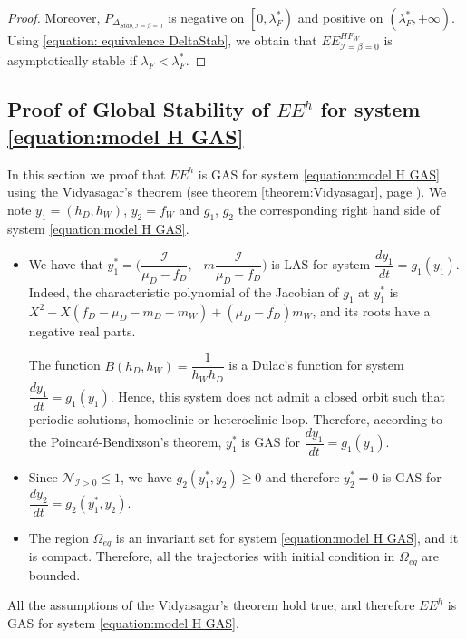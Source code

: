 \documentclass{article}
\newcommand{\lfw}{\lambda_{F}}
\newcommand{\lfw}{\lambda_{F}}
\newcommand{\cI}{\mathcal{I}}
\newcommand{\N}{\mathcal{N}}
\theoremstyle{definition}
\theoremstyle{remark}
\begin{document}
\begin{appendix}
\begin{proof}
Moreover, $P_{\Delta_{Stab, \cI = \beta = 0}}$ is negative on $\left[0, \lfw^* \right)$ and positive on $\left(\lfw ^*, +\infty \right)$. Using \eqref{equation: equivalence DeltaStab}, we obtain that $EE^{HF_W}_{\cI = \beta = 0}$ is asymptotically stable if $\lfw  < \lfw ^*$.
\end{proof}

\subsection{Proof of Global Stability of $EE^{h}$ for system \eqref{equation:model H GAS}} \label{sec:lemma H GAS}
In this section we proof that $EE^{h}$ is GAS for system \eqref{equation:model H GAS} using the Vidyasagar's theorem (see theorem \ref{theorem:Vidyasagar}, page \pageref{theorem:Vidyasagar}). We note $y_1 = (h_D, h_W)$, $y_2 = f_W$ and $g_1$, $g_2$ the corresponding right hand side of system \eqref{equation:model H GAS}.

\begin{itemize}
\item We have that $y_1^* = \Big(\dfrac{\cI}{\mu_D - f_D}, -m\dfrac{\cI}{\mu_D - f_D} \Big)$ is LAS for system $\dfrac{dy_1}{dt} = g_1(y_1)$. Indeed, the characteristic polynomial of the Jacobian of $g_1$ at $y_1^*$ is $X^2 - X(f_D - \mu_D - m_D - m_W) + (\mu_D - f_D) m_W$, and its roots have a negative real parts. 

The function $B(h_D, h_W) = \dfrac{1}{h_Wh_D}$ is a Dulac's function for system $\dfrac{dy_1}{dt} = g_1(y_1)$. Hence, this system does not admit a closed orbit such that periodic solutions, homoclinic or heteroclinic loop.
Therefore, according to the Poincaré-Bendixson's theorem, $y_1^*$ is GAS for $\dfrac{dy_1}{dt} = g_1(y_1)$.
\item Since $\N_{\cI > 0} \leq 1$, we have $g_2(y_1^*, y_2) \geq 0$ and therefore $y_2^* = 0$ is GAS for $\dfrac{dy_2}{dt} = g_2(y_1^*, y_2)$.
\item The region $\Omega_{eq}$ is an invariant set for system \eqref{equation:model H GAS}, and it is compact. Therefore, all the trajectories with initial condition in $\Omega_{eq}$ are bounded.
\end{itemize}
All the assumptions of the Vidyasagar's theorem hold true, and therefore $EE^{h}$ is GAS for system \eqref{equation:model H GAS}.


\end{appendix}



\newpage



\end{document}
